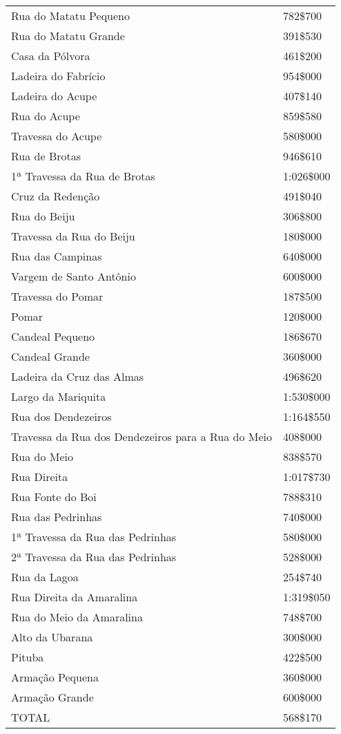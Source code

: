 \begin{table}[!htp]
{\begin{tiny}
\begin{tabular}{ll}
Rua do Matatu Pequeno	&782\$700\\
Rua do Matatu Grande	&391\$530\\
Casa da Pólvora	&461\$200\\
Ladeira do Fabrício	&954\$000\\
Ladeira do Acupe	&407\$140\\
Rua do Acupe	&859\$580\\
Travessa do Acupe	&580\$000\\
Rua de Brotas	&946\$610\\
1ª Travessa da Rua de Brotas	&1:026\$000\\
Cruz da Redenção	&491\$040\\
Rua do Beiju	&306\$800\\
Travessa da Rua do Beiju	&180\$000\\
Rua das Campinas	&640\$000\\
Vargem de Santo Antônio	&600\$000\\
Travessa do Pomar	&187\$500\\
Pomar	&120\$000\\
Candeal Pequeno	&186\$670\\
Candeal Grande	&360\$000\\
Ladeira da Cruz das Almas	&496\$620\\
Largo da Mariquita	&1:530\$000\\
Rua dos Dendezeiros	&1:164\$550\\
Travessa da Rua dos Dendezeiros para a Rua do Meio	&408\$000\\
Rua do Meio	&838\$570\\
Rua Direita	&1:017\$730\\
Rua Fonte do Boi	&788\$310\\
Rua das Pedrinhas	&740\$000\\
1ª Travessa da Rua das Pedrinhas	&580\$000\\
2ª Travessa da Rua das Pedrinhas	&528\$000\\
Rua da Lagoa	&254\$740\\
Rua Direita da Amaralina	&1:319\$050\\
Rua do Meio da Amaralina	&748\$700\\
Alto da Ubarana	&300\$000\\
Pituba	&422\$500\\
Armação Pequena	&360\$000\\
Armação Grande	&600\$000\\
\hline
TOTAL	&568\$170\\
\hline
\end{tabular} 
\end{tiny}
}
{}
\end{table}
